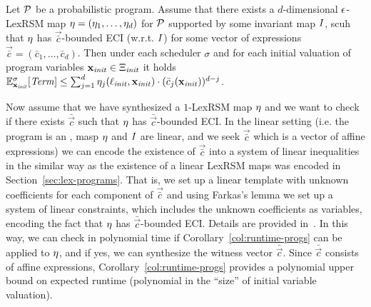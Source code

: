 \begin{corollary}
\label{col:runtime-progs}
Let $\mathcal{P}$ be a probabilistic program. Assume that there exists a 
$d$-dimensional $\epsilon$-LexRSM map $\mathbf{\eta}=(\eta_1,\dots,\eta_d)$ for 
$\mathcal{P}$ supported 
by some 
invariant map $I$, scuh that $\mathbf{\eta}$ has $\vec{\bar{c}}$-bounded ECI 
(w.r.t. $I$) 
for some vector of expressions $\vec{\bar{c}}=(\bar{c}_1,\dots,\bar{c}_d)$. 
Then under each scheduler $\sigma$ and for each initial valuation of program 
variables $\mathbf{x}_{\mathit{init}}\in\Xi_{\mathit{init}}$ it holds $\mathbb{E}^{\sigma}_{\mathbf{x}_{\mathit{init}}}[\mathit{Term}]\leq 
\sum_{j=1}^{d}\eta_j(\ell_{\mathit{init}},\mathbf{x}_{\mathit{init}})\cdot(\bar{c}_j(\mathbf{x}_{\mathit{init}}))^{d-j}$.
\end{corollary}

Now assume that we have synthesized a $1$-LexRSM map $\mathbf{\eta}$ and we want 
to check if there exists $\bar{\vec{c}}$ such that $\mathbf{\eta}$ has 
$\bar{\vec{c}}$-bounded ECI. In the linear setting (i.e. the program is an 
\APP{}, masp $\eta$ and $I$ are linear, and we seek $\vec{\bar{c}}$ which is 
a vector of affine expressions) we can encode the existence of $\vec{\bar{c}}$ 
into a system of linear inequalities in the similar way as the existence of a 
linear LexRSM maps was encoded in Section~\ref{sec:lex-programs}. That is, we 
set up a linear template with unknown coefficients for each component of 
$\vec{\bar{c}}$ and using Farkas's lemma we set up a system of linear 
constraints, which includes the unknown coefficients as variables, encoding the 
fact that $\mathbf{\eta}$ has $\bar{\vec{c}}$-bounded ECI. Details are provided 
in~\AppendixMaterial. In this way, we can check in polynomial time if 
Corollary~\ref{col:runtime-progs} can be applied to $\mathbf{\eta}$, and if yes, 
we can synthesize the witness vector $\bar{\vec{c}}$. Since $\bar{\vec{c}}$ 
consists of affine expressions, Corollary~\ref{col:runtime-progs} provides a 
polynomial upper bound on expected runtime (polynomial in the ``size'' of 
initial variable valuation).


